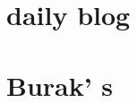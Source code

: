 \documentclass[aip,cha,
reprint,
secnumarabic,
nofootinbib, tightenlines,
nobibnotes, showkeys, showpacs,
groupedaddress,
]{revtex4-1}
\begin{document}
    \newpage
    \section{{\twoMode} daily blog}
    \label{chap:2modes}

    \newpage
    \section{Burak' s {\twomode}}
    \label{chap:2modesBB}


\fi %
\end{document}
